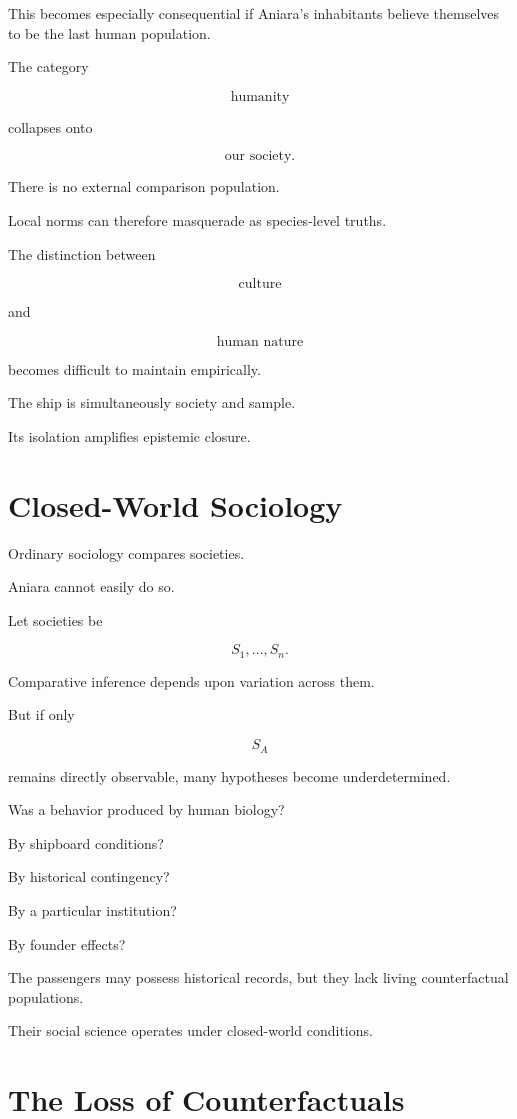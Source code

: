 \documentclass[11pt,oneside]{book}
\theoremstyle{definition}
\theoremstyle{remark}
\begin{document}
This becomes especially consequential if Aniara's inhabitants believe themselves to be the last human population.

The category

\[
\text{humanity}
\]

collapses onto

\[
\text{our society}.
\]

There is no external comparison population.

Local norms can therefore masquerade as species-level truths.

The distinction between

\[
\text{culture}
\]

and

\[
\text{human nature}
\]

becomes difficult to maintain empirically.

The ship is simultaneously society and sample.

Its isolation amplifies epistemic closure.

\section{Closed-World Sociology}

Ordinary sociology compares societies.

Aniara cannot easily do so.

Let societies be

\[
S_1,\ldots,S_n.
\]

Comparative inference depends upon variation across them.

But if only

\[
S_A
\]

remains directly observable, many hypotheses become underdetermined.

Was a behavior produced by human biology?

By shipboard conditions?

By historical contingency?

By a particular institution?

By founder effects?

The passengers may possess historical records, but they lack living counterfactual populations.

Their social science operates under closed-world conditions.

\section{The Loss of Counterfactuals}
\end{document}
